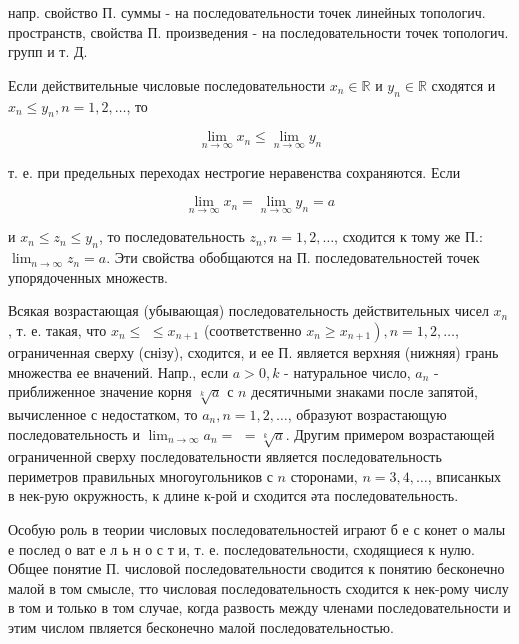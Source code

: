 \documentclass[10pt]{article}
\begin{document}
напр. свойство П. суммы - на последовательности точек линейных топологич. пространств, свойства П. произведения - на последовательности точек топологич. групп и т. Д.



Если действительные числовые последовательности $x_{n} \in \mathbb{R}$ и $y_{n} \in \mathbb{R}$ сходятся и $x_{n} \leqslant y_{n}, n=1,2, \ldots$, то



\[

\lim _{n \rightarrow \infty} x_{n} \leqslant \lim _{n \rightarrow \infty} y_{n}

\]



т. е. при предельных переходах нестрогие неравенства сохраняются. Если



\[

\lim _{n \rightarrow \infty} x_{n}=\lim _{n \rightarrow \infty} y_{n}=a

\]



и $x_{n} \leqslant z_{n} \leqslant y_{n}$, то последовательность $z_{n}, n=1,2, \ldots$, сходится к тому же П.: $\lim _{n \rightarrow \infty} z_{n}=a$. Эти свойства обобщаются на П. последовательностей точек упорядоченных множеств.



Всякая возрастающая (убывающая) последовательность действительных чисел $x_{n}$, т. е. такая, что $x_{n} \leqslant$ $\leqslant x_{n+1}$ (соответственно $\left.x_{n} \geqslant x_{n+1}\right), n=1,2, \ldots$, ограниченная сверху (снізу), сходится, и ее П. является верхняя (нижняя) грань множества ее вначений. Напр., если $a>0, k$ - натуральное число, $a_{n}$ - приближенное значение корня $\sqrt[k]{a}$ с $n$ десятичными знаками после запятой, вычисленное с недостатком, то $a_{n}, n=1,2, \ldots$, образуют возрастающую последовательность и $\lim _{n \rightarrow \infty} a_{n}=$ $=\sqrt[k]{a}$. Другим примером возрастающей ограниченной сверху последовательности является последовательность периметров правильных многоугольников с $n$ сторонами, $n=3,4, \ldots$, вписанкых в нек-рую окружность, к длине к-рой и сходится әта последовательность.



Особую роль в теории числовых последовательностей играют б е с конет о малы е послед о ват е л ь н о с т и, т. е. последовательности, сходящиеся к нулю. Общее понятие П. числовой последовательности сводится к понятию бесконечно малой в том смысле, тто числовая последовательность сходится к нек-рому числу в том и только в том случае, когда развость между членами последовательности и этим числом пвляется бесконечно малой последовательностью.
\end{document}
